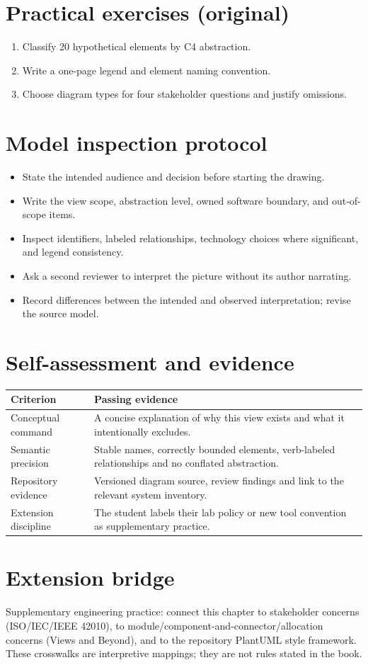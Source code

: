 \documentclass[10pt,letterpaper]{article}
\begin{document}
\section{Practical exercises (original)}
\begin{enumerate}
\item Classify 20 hypothetical elements by C4 abstraction.
\item Write a one-page legend and element naming convention.
\item Choose diagram types for four stakeholder questions and justify omissions.
\end{enumerate}

\section{Model inspection protocol}
\begin{itemize}
\item State the intended audience and decision before starting the drawing.
\item Write the view scope, abstraction level, owned software boundary, and out-of-scope items.
\item Inspect identifiers, labeled relationships, technology choices where significant, and legend consistency.
\item Ask a second reviewer to interpret the picture without its author narrating.
\item Record differences between the intended and observed interpretation; revise the source model.
\end{itemize}

\section{Self-assessment and evidence}
\begin{tabularx}{\linewidth}{@{}YY@{}}\toprule
\textbf{Criterion} & \textbf{Passing evidence} \\ \midrule
Conceptual command & A concise explanation of why this view exists and what it intentionally excludes. \\
Semantic precision & Stable names, correctly bounded elements, verb-labeled relationships and no conflated abstraction. \\
Repository evidence & Versioned diagram source, review findings and link to the relevant system inventory. \\
Extension discipline & The student labels their lab policy or new tool convention as supplementary practice. \\
\bottomrule\end{tabularx}


\section{Extension bridge}
Supplementary engineering practice: connect this chapter to stakeholder concerns (ISO/IEC/IEEE 42010), to module/component-and-connector/allocation concerns (Views and Beyond), and to the repository PlantUML style framework. These crosswalks are interpretive mappings; they are not rules stated in the book.
\end{document}
